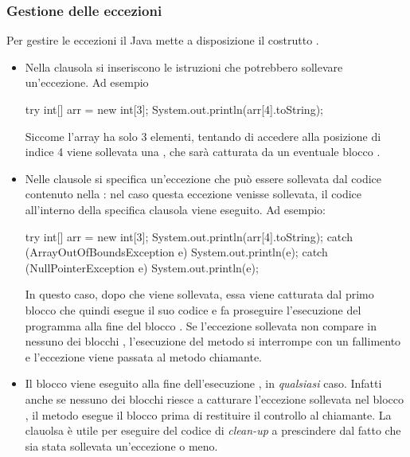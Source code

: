 \subsubsection{Gestione delle eccezioni}
Per gestire le eccezioni il Java mette a disposizione il costrutto .
\begin{itemize}
    \item Nella clausola  si inseriscono le istruzioni che potrebbero sollevare un'eccezione. Ad esempio \begin{Java}
        try {
            int[] arr = new int[3];
            System.out.println(arr[4].toString);
        }
    \end{Java}
    Siccome l'array ha solo 3 elementi, tentando di accedere alla posizione di indice 4 viene sollevata una , che sarà catturata da un eventuale blocco .
    \item Nelle clausole  si specifica un'eccezione che può essere sollevata dal codice contenuto nella : nel caso questa eccezione venisse sollevata, il codice all'interno della specifica clausola  viene eseguito. Ad esempio:
    \begin{Java}
        try {
            int[] arr = new int[3];
            System.out.println(arr[4].toString);
        } catch (ArrayOutOfBoundsException e) {
            System.out.println(e);
        } catch (NullPointerException e) {
            System.out.println(e);
        }
    \end{Java}
    In questo caso, dopo che  viene sollevata, essa viene catturata dal primo blocco  che quindi esegue il suo codice e fa proseguire l'esecuzione del programma alla fine del blocco .
    Se l'eccezione sollevata non compare in nessuno dei blocchi , l'esecuzione del metodo si interrompe con un fallimento e l'eccezione viene passata al metodo chiamante.
    \item Il blocco  viene eseguito alla fine dell'esecuzione , in \emph{qualsiasi} caso. Infatti anche se nessuno dei blocchi  riesce a catturare l'eccezione sollevata nel blocco , il metodo esegue il blocco  prima di restituire il controllo al chiamante. La clauolsa  è utile per eseguire del codice di \emph{clean-up} a prescindere dal fatto che sia stata sollevata un'eccezione o meno.
\end{itemize}

